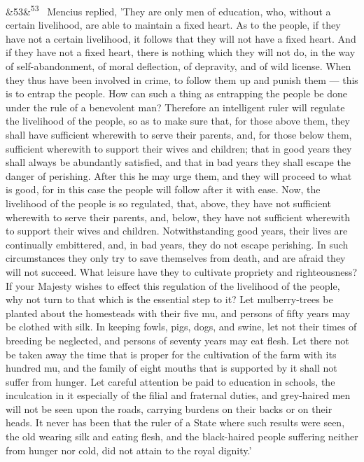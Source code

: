 \documentclass[12pt]{article}
\newcommand{\para}[1][]{\par\noindent\ifx&#1&\else\textsuperscript{\footnotesize #1}~\fi}
\begin{document}
\para[53] Mencius replied, 'They are only men of education, who, without a certain livelihood, are able to maintain a fixed heart. As to the people, if they have not a certain livelihood, it follows that they will not have a fixed heart. And if they have not a fixed heart, there is nothing which they will not do, in the way of self-abandonment, of moral deflection, of depravity, and of wild license. When they thus have been involved in crime, to follow them up and punish them --- this is to entrap the people. How can such a thing as entrapping the people be done under the rule of a benevolent man? Therefore an intelligent ruler will regulate the livelihood of the people, so as to make sure that, for those above them, they shall have sufficient wherewith to serve their parents, and, for those below them, sufficient wherewith to support their wives and children; that in good years they shall always be abundantly satisfied, and that in bad years they shall escape the danger of perishing. After this he may urge them, and they will proceed to what is good, for in this case the people will follow after it with ease. Now, the livelihood of the people is so regulated, that, above, they have not sufficient wherewith to serve their parents, and, below, they have not sufficient wherewith to support their wives and children. Notwithstanding good years, their lives are continually embittered, and, in bad years, they do not escape perishing. In such circumstances they only try to save themselves from death, and are afraid they will not succeed. What leisure have they to cultivate propriety and righteousness? If your Majesty wishes to effect this regulation of the livelihood of the people, why not turn to that which is the essential step to it? Let mulberry-trees be planted about the homesteads with their five mu, and persons of fifty years may be clothed with silk. In keeping fowls, pigs, dogs, and swine, let not their times of breeding be neglected, and persons of seventy years may eat flesh. Let there not be taken away the time that is proper for the cultivation of the farm with its hundred mu, and the family of eight mouths that is supported by it shall not suffer from hunger. Let careful attention be paid to education in schools, the inculcation in it especially of the filial and fraternal duties, and grey-haired men will not be seen upon the roads, carrying burdens on their backs or on their heads. It never has been that the ruler of a State where such results were seen, the old wearing silk and eating flesh, and the black-haired people suffering neither from hunger nor cold, did not attain to the royal dignity.'
\end{document}
